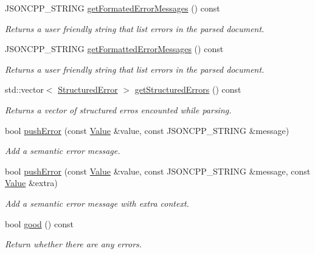 \begin{DoxyCompactItemize}
J\+S\+O\+N\+C\+P\+P\+\_\+\+S\+T\+R\+I\+NG \hyperlink{classJson_1_1Reader_a791cbc5afd1bef1631e07239dc452c79}{get\+Formated\+Error\+Messages} () const
\begin{DoxyCompactList}\small\item\em Returns a user friendly string that list errors in the parsed document. \end{DoxyCompactList}\item 
J\+S\+O\+N\+C\+P\+P\+\_\+\+S\+T\+R\+I\+NG \hyperlink{classJson_1_1Reader_ae638a7b1f36f7ccf99ba89fa36ccf222}{get\+Formatted\+Error\+Messages} () const
\begin{DoxyCompactList}\small\item\em Returns a user friendly string that list errors in the parsed document. \end{DoxyCompactList}\item 
std\+::vector$<$ \hyperlink{structJson_1_1Reader_1_1StructuredError}{Structured\+Error} $>$ \hyperlink{classJson_1_1Reader_ae3d714e95bd98b27e296c607e408189b}{get\+Structured\+Errors} () const
\begin{DoxyCompactList}\small\item\em Returns a vector of structured erros encounted while parsing. \end{DoxyCompactList}\item 
bool \hyperlink{classJson_1_1Reader_af5fa7099083f01706635ade1d0f8ddb5}{push\+Error} (const \hyperlink{classJson_1_1Value}{Value} \&value, const J\+S\+O\+N\+C\+P\+P\+\_\+\+S\+T\+R\+I\+NG \&message)
\begin{DoxyCompactList}\small\item\em Add a semantic error message. \end{DoxyCompactList}\item 
bool \hyperlink{classJson_1_1Reader_a3568be9db568ff57bd3fcc373143dff3}{push\+Error} (const \hyperlink{classJson_1_1Value}{Value} \&value, const J\+S\+O\+N\+C\+P\+P\+\_\+\+S\+T\+R\+I\+NG \&message, const \hyperlink{classJson_1_1Value}{Value} \&extra)
\begin{DoxyCompactList}\small\item\em Add a semantic error message with extra context. \end{DoxyCompactList}\item 
bool \hyperlink{classJson_1_1Reader_a86cbb42b3e6d4a4d6416473b1a8f6ae7}{good} () const
\begin{DoxyCompactList}\small\item\em Return whether there are any errors. \end{DoxyCompactList}\end{DoxyCompactItemize}
